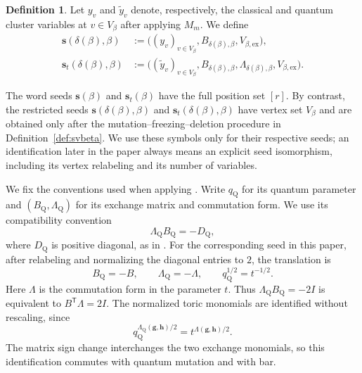\documentclass[12pt, reqno]{amsart}
\theoremstyle{plain}
\theoremstyle{definition}
\newtheorem{definition}[theorem]{Definition}
\numberwithin{equation}{section}
\begin{document}
\begin{definition}
    Let \(y_v\) and \(\widetilde y_v\) denote, respectively, the
    classical and quantum cluster variables at \(v\in V_\beta\) after
    applying \(M_m\). We define
    \begin{equation}\label{eq:seed-delta-beta}
        \begin{aligned}
            \mathbf s(\delta(\beta),\beta)
            &:=\bigl(
                (y_v)_{v\in V_\beta},
                B_{\delta(\beta),\beta},
                V_{\beta,\mathrm{ex}}
            \bigr),\\
            \mathbf s_t(\delta(\beta),\beta)
            &:=\bigl(
                (\widetilde y_v)_{v\in V_\beta},
                B_{\delta(\beta),\beta},
                \Lambda_{\delta(\beta),\beta},
                V_{\beta,\mathrm{ex}}
            \bigr).
        \end{aligned}
    \end{equation}
\end{definition}

The word seeds \(\mathbf s(\beta)\) and \(\mathbf s_t(\beta)\)
have the full position set \([r]\). By contrast, the restricted
seeds \(\mathbf s(\delta(\beta),\beta)\) and
\(\mathbf s_t(\delta(\beta),\beta)\) have vertex set \(V_\beta\)
and are obtained only after the mutation--freezing--deletion
procedure in Definition~\ref{def:svbeta}. We use these symbols only
for their respective seeds; an identification later in the paper
always means an explicit seed isomorphism, including its vertex
relabeling and its number of variables.

We fix the conventions used when applying \cite{qin2024analogs}.
Write \(q_{\mathrm Q}\) for its quantum parameter and
\((B_{\mathrm Q},\Lambda_{\mathrm Q})\) for its exchange matrix and
commutation form. We use its compatibility convention
\[
 \Lambda_{\mathrm Q}B_{\mathrm Q}=-D_{\mathrm Q},
\]
where \(D_{\mathrm Q}\) is positive diagonal, as in
\cite[Section~4.1 and Example~7.8]{qin2024analogs}.
For the corresponding seed in this paper, after relabeling and
normalizing the diagonal entries to \(2\), the translation is
\begin{equation}\label{eq:Qin-quantum-convention-translation}
 B_{\mathrm Q}=-B,
 \qquad \Lambda_{\mathrm Q}=-\Lambda,
 \qquad q_{\mathrm Q}^{1/2}=t^{-1/2}.
\end{equation}
Here \(\Lambda\) is the commutation form in the parameter \(t\).
Thus \(\Lambda_{\mathrm Q}B_{\mathrm Q}=-2I\) is equivalent to
\(B^{\mathsf T}\Lambda=2I\). The normalized toric monomials are
identified without rescaling, since
\[
 q_{\mathrm Q}^{\Lambda_{\mathrm Q}(\mathbf g,\mathbf h)/2}
 =t^{\Lambda(\mathbf g,\mathbf h)/2}.
\]
The matrix sign change interchanges the two exchange monomials, so
this identification commutes with quantum mutation and with bar.
\end{document}
